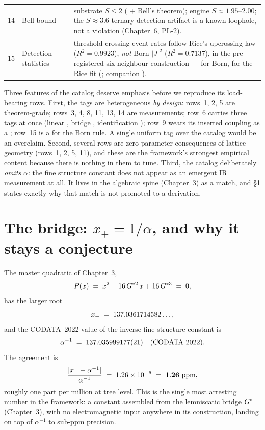 \begin{xltabular}{\linewidth}{@{}r >{\RaggedRight}p{2.6cm} >{\RaggedRight}p{2.0cm} >{\RaggedRight}X@{}}
  14 & Bell bound &  &
    substrate $S \le 2$ ( $+$ Bell's theorem); engine
    $S \approx 1.95$--$2.00$; the $S \approx 3.6$ ternary-detection artifact is a
    known loophole, not a violation (Chapter~6, PL-2). \\

  15 & Detection statistics &  &
    threshold-crossing event rates follow Rice's upcrossing law
    ($R^2 = 0.9923$), \emph{not} Born $|J|^2$ ($R^2 = 0.7137$), in the
    pre-registered six-neighbour construction ---  for Born, 
    for the Rice fit (; companion ). \\
\end{xltabular}

Three features of the catalog deserve emphasis before we reproduce its
load-bearing rows. First, the tags are heterogeneous \emph{by design}: rows~1,
2, 5 are theorem-grade; rows~3, 4, 8, 11, 13, 14 are measurements; row~6 carries
three tags at once (linear , bridge , identification
); row~9 wears its inserted coupling as a ; row~15 is a
 for the Born rule. A single uniform tag over the catalog would be an
overclaim. Second, several rows are zero-parameter consequences of lattice
geometry (rows~1, 2, 5, 11), and these are the framework's strongest empirical
content because there is nothing in them to tune. Third, the catalog deliberately
\emph{omits} $\alpha$: the fine structure constant does not appear as an emergent
IR measurement at all. It lives in the algebraic spine (Chapter~3) as a
match, and \S\ref{sec:alphabridge} states exactly why that match is not promoted
to a derivation.

\section{The bridge: $x_+ = 1/\alpha$, and why it stays a conjecture}
\label{sec:alphabridge}

The master quadratic of Chapter~3,
\[
  P(x) \;=\; x^{2} - 16\,G^{*2}\,x + 16\,G^{*3} \;=\; 0,
\]
has the larger root
\[
  x_+ \;=\; 137.0361714582\ldots,
\]
and the CODATA~2022 value of the inverse fine structure constant is
\[
  \alpha^{-1} \;=\; 137.035999177(21) \quad \text{(CODATA 2022)}.
\]
The agreement is
\[
  \frac{\lvert x_+ - \alpha^{-1}\rvert}{\alpha^{-1}} \;=\; 1.26\times 10^{-6} \;=\; \mathbf{1.26\ \text{ppm}} ,
\]
roughly one part per million at tree level. This is the single most arresting
number in the framework: a constant assembled from the lemniscatic bridge
$G^{*}$ (Chapter~3), with no electromagnetic input anywhere in its construction,
landing on top of $\alpha^{-1}$ to sub-ppm precision.

